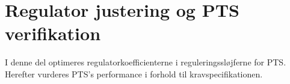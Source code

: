 \part{Regulator justering og PTS verifikation}
I denne del optimeres regulatorkoefficienterne i reguleringssløjferne for PTS.
Herefter vurderes PTS's performance i forhold til kravspecifikationen.

%
